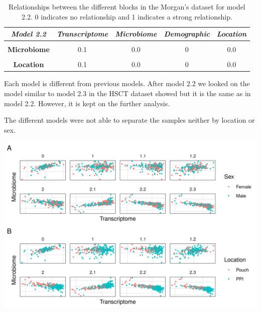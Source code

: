 \documentclass[
  12pt,
  a4paper,
  twoside,
  openright]{book}
\let\origfigure\figure
\let\endorigfigure\endfigure
\renewenvironment{figure}[1][2] {
    \expandafter\origfigure\expandafter[!htp]
} {
    \endorigfigure
}
\begin{document}
\begin{table}[H]

\caption[Model 2.2 of the Morgan's dataset.]{\label{tab:morgan-model2-2}Relationships between the different blocks in the Morgan's dataset for model 2.2. 0 indicates no relationship and 1 indicates a strong relationship.}
\centering
\begin{tabular}[t]{|>{}c|c|c|c|>{}c|}
\hline
\em{\textbf{Model 2.2}} & \em{\textbf{Transcriptome}} & \em{\textbf{Microbiome}} & \em{\textbf{Demographic}} & \em{\textbf{Location}}\\
\hline
\textbf{\cellcolor{gray!6}{Transcriptome}} & \cellcolor{gray!6}{0.0} & \cellcolor{gray!6}{0.1} & \cellcolor{gray!6}{1} & \cellcolor{gray!6}{0.1}\\
\hline
\textbf{Microbiome} & 0.1 & 0.0 & 0 & 0.0\\
\hline
\textbf{\cellcolor{gray!6}{Demographic}} & \cellcolor{gray!6}{1.0} & \cellcolor{gray!6}{0.0} & \cellcolor{gray!6}{0} & \cellcolor{gray!6}{0.0}\\
\hline
\textbf{Location} & 0.1 & 0.0 & 0 & 0.0\\
\hline
\end{tabular}
\end{table}

Each model is different from previous models.
After model 2.2 we looked on the model similar to model 2.3 in the HSCT dataset showed but it is the same as in model 2.2.
However, it is kept on the further analysis.

The different models were not able to separate the samples neither by location or sex.

\begin{figure}
\includegraphics[width=1\linewidth]{images/morgan_models} \caption[Models from inteRmodel in the Morgan's dataset. ]{Models from inteRmodel in the Morgan's dataset. First component of the transcriptome and microbiome of models on the Morgan's dataset. Model 0 without sample data. Model 1 to 1.2 with all the sample data in a single block and models 2.1 to 2.3 with sample data in several blocks. Panel A shows samples colored by sex and panel B by segment of the sample. There is no clear classification neither by location nor sex on any of the models.}\label{fig:morgan-models}
\end{figure}
\end{document}
